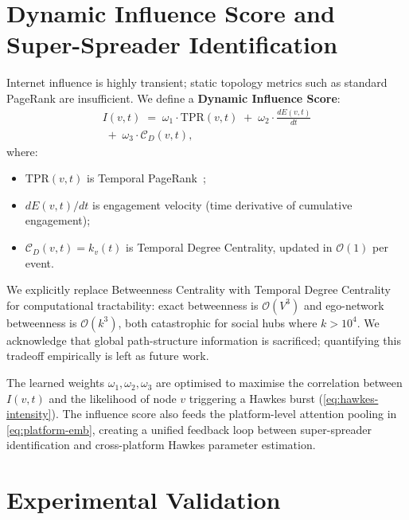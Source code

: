 \documentclass[11pt]{article}
\begin{document}
\section{Dynamic Influence Score and Super-Spreader Identification}
\label{sec:influence}

Internet influence is highly transient; static topology metrics such as
standard PageRank are insufficient. We define a \textbf{Dynamic Influence
Score}:
\begin{multline}
  I(v,t)
  \;=\;
  \omega_1\cdot\mathrm{TPR}(v,t)
  \;+\;
  \omega_2\cdot\frac{dE(v,t)}{dt} \\
  \;+\;
  \omega_3\cdot\mathcal{C}_D(v,t),
  \label{eq:influence}
\end{multline}
where:
\begin{itemize}[noitemsep]
  \item $\mathrm{TPR}(v,t)$ is Temporal PageRank~\citep{rozenshtein2016temporal};
  \item $dE(v,t)/dt$ is engagement velocity (time derivative of cumulative
        engagement);
  \item $\mathcal{C}_D(v,t) = k_v(t)$ is Temporal Degree Centrality, updated
        in $\mathcal{O}(1)$ per event.
\end{itemize}
We explicitly replace Betweenness Centrality with Temporal Degree Centrality
for computational tractability: exact betweenness is $\mathcal{O}(V^3)$ and
ego-network betweenness is $\mathcal{O}(k^3)$, both catastrophic for social
hubs where $k > 10^4$. We acknowledge that global path-structure information
is sacrificed; quantifying this tradeoff empirically is left as future work.

The learned weights $\omega_1,\omega_2,\omega_3$ are optimised to maximise
the correlation between $I(v,t)$ and the likelihood of node $v$ triggering a
Hawkes burst (\cref{eq:hawkes-intensity}). The influence score also feeds the
platform-level attention pooling in \cref{eq:platform-emb}, creating a unified
feedback loop between super-spreader identification and cross-platform Hawkes
parameter estimation.

\section{Experimental Validation}
\label{sec:experiments}
\end{document}
